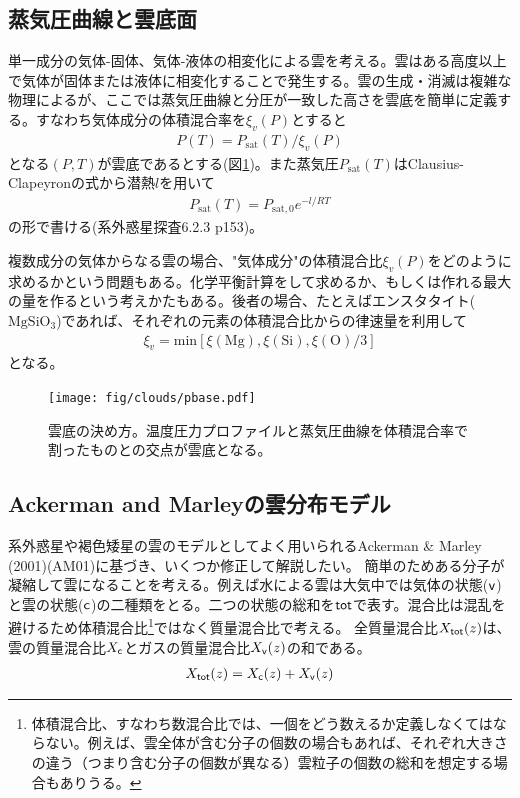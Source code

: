 \subsection*{蒸気圧曲線と雲底面}

単一成分の気体-固体、気体-液体の相変化による雲を考える。雲はある高度以上で気体が固体または液体に相変化することで発生する。雲の生成・消滅は複雑な物理によるが、ここでは蒸気圧曲線と分圧が一致した高さを雲底を簡単に定義する。すなわち気体成分の体積混合率を$\xi_v(P)$とすると
\begin{align}
P(T) = P_\mathrm{sat}(T)/\xi_v(P)
\end{align}
となる$(P,T)$が雲底であるとする(図\ref{fig:pbase})。また蒸気圧$P_\mathrm{sat}(T)$はClausius-Clapeyronの式から潜熱$l$を用いて
\begin{align}
P_\mathrm{sat}(T) = P_\mathrm{sat,0} e^{-l/RT}
\end{align}
の形で書ける(系外惑星探査6.2.3 p153)。


複数成分の気体からなる雲の場合、"気体成分"の体積混合比$\xi_v(P)$をどのように求めるかという問題もある。化学平衡計算をして求めるか、もしくは作れる最大の量を作るという考えかたもある。後者の場合、たとえばエンスタタイト($\mathrm{Mg Si O_3}$)であれば、それぞれの元素の体積混合比からの律速量を利用して
\begin{align}
\xi_v = \mathrm{min} [ \xi(\mathrm{Mg}),\xi(\mathrm{Si}),\xi(\mathrm{O})/3 ]
\end{align}
となる。

\begin{figure}[htb]
\begin{center}
\texttt{[image: fig/clouds/pbase.pdf]}
\caption{雲底の決め方。温度圧力プロファイルと蒸気圧曲線を体積混合率で割ったものとの交点が雲底となる。\label{fig:pbase}}
\end{center}
\end{figure}

\subsection*{Ackerman and Marleyの雲分布モデル}


系外惑星や褐色矮星の雲のモデルとしてよく用いられるAckerman \& Marley (2001)\cite{ackerman2001precipitating}(AM01)に基づき、いくつか修正して解説したい。
簡単のためある分子が凝縮して雲になることを考える。例えば水による雲は大気中では気体の状態(${\mathsf{v}}$)と雲の状態(${\mathsf{c}}$)の二種類をとる。二つの状態の総和を${\mathsf{tot}}$で表す。混合比は混乱を避けるため体積混合比\footnote{体積混合比、すなわち数混合比では、一個をどう数えるか定義しなくてはならない。例えば、雲全体が含む分子の個数の場合もあれば、それぞれ大きさの違う（つまり含む分子の個数が異なる）雲粒子の個数の総和を想定する場合もありうる。}ではなく質量混合比で考える。
全質量混合比$X_{\mathsf{tot}} (z) $は、雲の質量混合比$X_{\mathsf{c}}$とガスの質量混合比$X_{\mathsf{v}} (z)$の和である。
\begin{align}
X_{\mathsf{tot}} (z) = X_{\mathsf{c}} (z) + X_{\mathsf{v}} (z)
\end{align}

